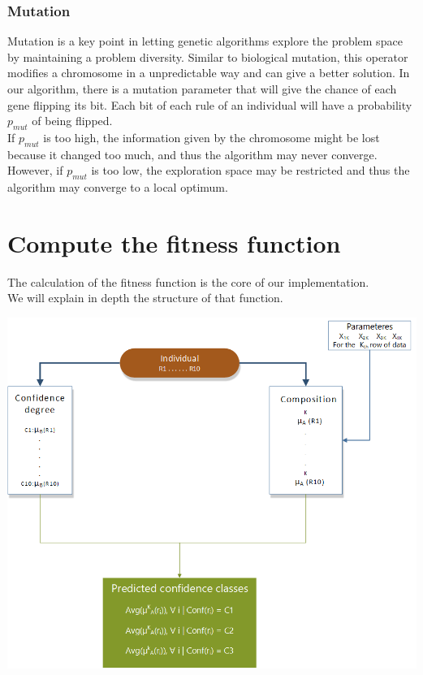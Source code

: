 \documentclass[a4paper,12pt]{article}
\begin{document}
\subsubsection{Mutation}

Mutation is a key point in letting genetic algorithms explore the problem space by maintaining a problem diversity. Similar to biological mutation, this operator modifies a chromosome in a unpredictable way and can give a better solution.
In our algorithm, there is a mutation parameter that will give the chance of each gene flipping its bit. Each bit of each rule of an individual will have a probability $p_{mut}$ of being flipped.\\
If $p_{mut}$ is too high, the information given by the chromosome might be lost because it changed too much, and thus the algorithm may never converge. However, if $p_{mut}$ is too low, the exploration space may be restricted and thus the algorithm may converge to a local optimum.

\section{Compute the fitness function}

The calculation of the fitness function is the core of our implementation.\\
We will explain in depth the structure of that function.

\begin{center}
\includegraphics[scale=0.3]{fitnessfunct}
\end{center}
\end{document}
